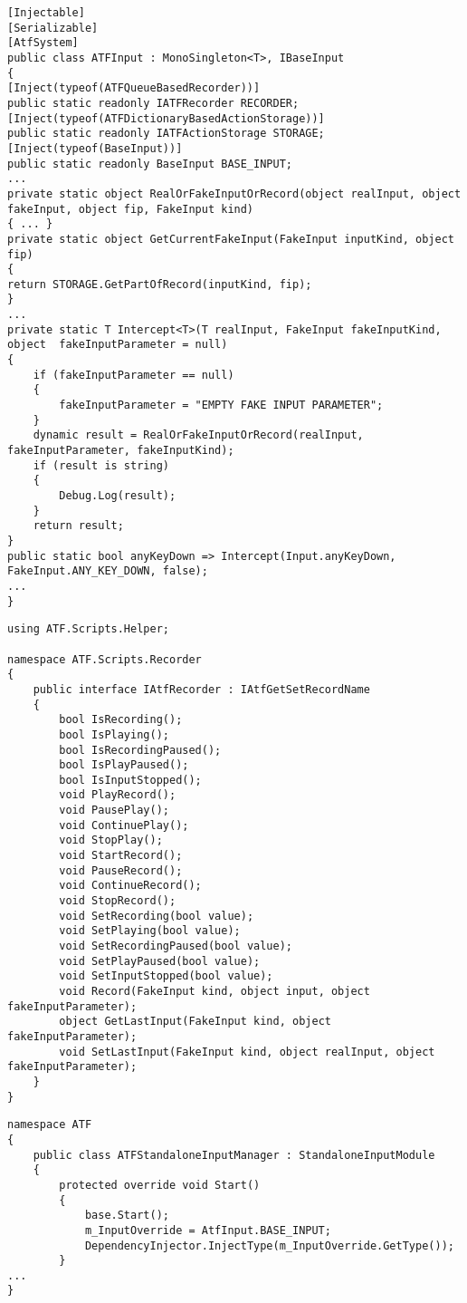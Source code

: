 \begin{lstlisting}[caption={Бизнес-логика системы симуляции и перехвата ввода},label=input]
[Injectable]
[Serializable]
[AtfSystem]
public class ATFInput : MonoSingleton<T>, IBaseInput
{
[Inject(typeof(ATFQueueBasedRecorder))]
public static readonly IATFRecorder RECORDER;
[Inject(typeof(ATFDictionaryBasedActionStorage))]
public static readonly IATFActionStorage STORAGE;
[Inject(typeof(BaseInput))]
public static readonly BaseInput BASE_INPUT;
...
private static object RealOrFakeInputOrRecord(object realInput, object fakeInput, object fip, FakeInput kind)
{ ... }
private static object GetCurrentFakeInput(FakeInput inputKind, object fip)
{
return STORAGE.GetPartOfRecord(inputKind, fip);
}
...
private static T Intercept<T>(T realInput, FakeInput fakeInputKind, object 	fakeInputParameter = null)
{
    if (fakeInputParameter == null)
    {
        fakeInputParameter = "EMPTY FAKE INPUT PARAMETER";
    }
    dynamic result = RealOrFakeInputOrRecord(realInput, fakeInputParameter, fakeInputKind);
    if (result is string)
    {
        Debug.Log(result);
    }
    return result;
}
public static bool anyKeyDown => Intercept(Input.anyKeyDown, FakeInput.ANY_KEY_DOWN, false);
...
}
\end{lstlisting}

\begin{lstlisting}[caption={Интерфейc модуля записи},label=iRecorder]
using ATF.Scripts.Helper;

namespace ATF.Scripts.Recorder
{
    public interface IAtfRecorder : IAtfGetSetRecordName
    {
        bool IsRecording();
        bool IsPlaying();
        bool IsRecordingPaused();
        bool IsPlayPaused();
        bool IsInputStopped();
        void PlayRecord();
        void PausePlay();
        void ContinuePlay();
        void StopPlay();
        void StartRecord();
        void PauseRecord();
        void ContinueRecord();
        void StopRecord();
        void SetRecording(bool value);
        void SetPlaying(bool value);
        void SetRecordingPaused(bool value);
        void SetPlayPaused(bool value);
        void SetInputStopped(bool value);
        void Record(FakeInput kind, object input, object fakeInputParameter);
        object GetLastInput(FakeInput kind, object fakeInputParameter);
        void SetLastInput(FakeInput kind, object realInput, object fakeInputParameter);
    }
}
\end{lstlisting}

\begin{lstlisting}[caption={Пользовательский модуль ввода для ATFInput},label=inputModule]
namespace ATF
{
	public class ATFStandaloneInputManager : StandaloneInputModule
	{
		protected override void Start()
        {
            base.Start();
            m_InputOverride = AtfInput.BASE_INPUT;
            DependencyInjector.InjectType(m_InputOverride.GetType());
        }
...
}
\end{lstlisting}

